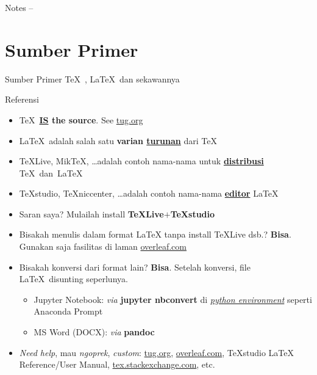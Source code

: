 \documentclass[11pt,            %
               aspectratio=169, %
               xcolor=svgnames,
               t                %
               ]{beamer}
\begin{document}
\begin{frame}{Notes}
\label{notes}
--
\end{frame}

\begin{frame}{\contentsname}
\label{contents}
\tableofcontents
{}
\end{frame}

\section{Sumber Primer}

\begin{frame}{Sumber Primer \TeX\ , \LaTeX\ dan sekawannya}
\begin{block}{Referensi}
\begin{itemize}
\item \TeX\ \textbf{\underline{IS} the source}. See \href{https://tug.org/}{tug.org}
\item \LaTeX\ adalah salah satu \textbf{varian \underline{turunan}} dari \TeX
\item TeXLive, MikTeX, \ldots adalah contoh nama-nama untuk \textbf{\underline{distribusi}} \TeX~dan~\LaTeX
\item TeXstudio, TeXniccenter, \ldots adalah contoh nama-nama \textbf{\underline{editor}} \LaTeX
\item Saran saya? Mulailah install \textbf{TeXLive}$+$\textbf{TeXstudio}
\item Bisakah menulis dalam format LaTeX tanpa install TeXLive dsb.? \textbf{Bisa}. Gunakan saja fasilitas di laman  \href{https://www.overleaf.com}{overleaf.com}
\item Bisakah konversi dari format lain? \textbf{Bisa}. Setelah konversi, file \LaTeX~disunting seperlunya.
\begin{itemize}
    \item Jupyter Notebook: \textit{via} \textbf{jupyter nbconvert} di \underline{\itshape python environment} seperti Anaconda Prompt
    \item MS Word (DOCX): \textit{via} \textbf{pandoc}
\end{itemize}
\item \textit{Need help}, mau \textit{ngoprek}, \textit{custom}: \href{https://tug.org/}{tug.org}, \href{https://www.overleaf.com}{overleaf.com}, TeXstudio LaTeX Reference/User Manual, \href{https://tex.stackexchange.com/}{tex.stackexchange.com}, etc.
\end{itemize}
\end{block}
\end{frame}
\end{document}

